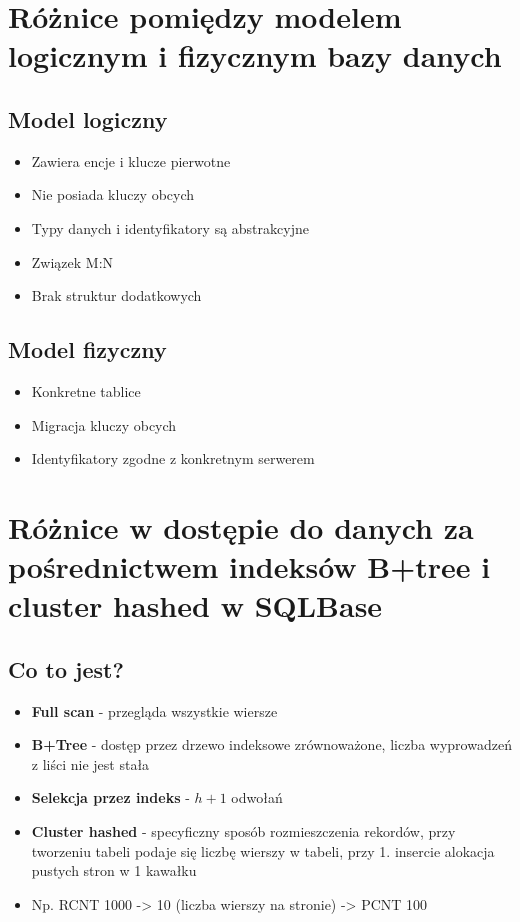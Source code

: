 \documentclass[a4paper,twoside]{article}
\begin{document}
  	\section*{Różnice pomiędzy modelem logicznym i fizycznym bazy danych}
  	\subsection*{Model logiczny}	%
  	\begin{itemize}
  		\item Zawiera encje i klucze pierwotne
  		\item Nie posiada kluczy obcych
  		\item Typy danych i identyfikatory są abstrakcyjne
  		\item Związek M:N
  		\item Brak struktur dodatkowych
  	\end{itemize}
  	\subsection*{Model fizyczny}	%
  	\begin{itemize}
  		\item Konkretne tablice
  		\item Migracja kluczy obcych
  		\item Identyfikatory zgodne z konkretnym serwerem
  	\end{itemize}
  	
  	\section*{Różnice w dostępie do danych za pośrednictwem indeksów B+tree i cluster hashed w SQLBase}
  	\subsection*{Co to jest?}
  	\begin{itemize}
  		\item \textbf{Full scan} - przegląda wszystkie wiersze
  		\item \textbf{B+Tree} - dostęp przez drzewo indeksowe zrównoważone, liczba wyprowadzeń z liści nie jest stała
  		\item \textbf{Selekcja przez indeks} - ${h+1}$ odwołań
  		\item \textbf{Cluster hashed} - specyficzny sposób rozmieszczenia rekordów, przy tworzeniu tabeli podaje się liczbę wierszy w tabeli, przy 1.  insercie alokacja pustych stron w 1 kawałku
  		\item Np. RCNT 1000 -> 10 (liczba wierszy na stronie) -> PCNT 100
  	\end{itemize}
\end{document}
